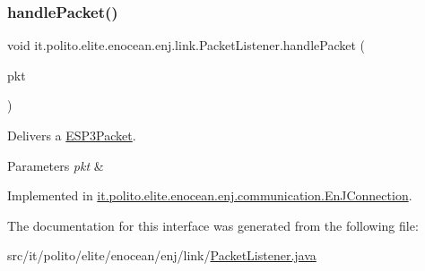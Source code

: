 \subsubsection{\texorpdfstring{handle\+Packet()}{handlePacket()}}
{\footnotesize\ttfamily void it.\+polito.\+elite.\+enocean.\+enj.\+link.\+Packet\+Listener.\+handle\+Packet (\begin{DoxyParamCaption}\item[{\hyperlink{classit_1_1polito_1_1elite_1_1enocean_1_1protocol_1_1serial_1_1v3_1_1network_1_1packet_1_1_e_s_p3_packet}{E\+S\+P3\+Packet}}]{pkt }\end{DoxyParamCaption})}

Delivers a \hyperlink{}{E\+S\+P3\+Packet}. 
\begin{DoxyParams}{Parameters}
{\em pkt} & \\
\hline
\end{DoxyParams}


Implemented in \hyperlink{classit_1_1polito_1_1elite_1_1enocean_1_1enj_1_1communication_1_1_en_j_connection_ad182a8d74dda136f692a69c86d29cb09}{it.\+polito.\+elite.\+enocean.\+enj.\+communication.\+En\+J\+Connection}.



The documentation for this interface was generated from the following file\+:\begin{DoxyCompactItemize}
\item 
src/it/polito/elite/enocean/enj/link/\hyperlink{_packet_listener_8java}{Packet\+Listener.\+java}\end{DoxyCompactItemize}
